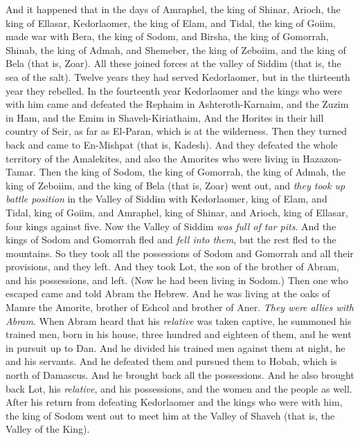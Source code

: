 \begin{biblechapter} %
 And it happened that in the days of Amraphel, the king of Shinar, Arioch, the king of Ellasar, Kedorlaomer, the king of Elam, and Tidal, the king of Goiim,
\verse made war with Bera, the king of Sodom, and Birsha, the king of Gomorrah, Shinab, the king of Admah, and Shemeber, the king of Zeboiim, and the king of Bela (that is, Zoar).
\verse All these joined forces at the valley of Siddim (that is, the sea of the salt).
\verse Twelve years they had served Kedorlaomer, but in the thirteenth year they rebelled.
\verse In the fourteenth year Kedorlaomer and the kings who were with him came and defeated the Rephaim in Ashteroth-Karnaim, and the Zuzim in Ham, and the Emim in Shaveh-Kiriathaim,
\verse And the Horites in their hill country of Seir, as far as El-Paran, which is at the wilderness.
\verse Then they turned back and came to En-Mishpat (that is, Kadesh). And they defeated the whole territory of the Amalekites, and also the Amorites who were living in Hazazon-Tamar.
\verse Then the king of Sodom, the king of Gomorrah, the king of Admah, the king of Zeboiim, and the king of Bela (that is, Zoar) went out, and \textit{they took up battle position} in the Valley of Siddim
\verse with Kedorlaomer, king of Elam, and Tidal, king of Goiim, and Amraphel, king of Shinar, and Arioch, king of Ellasar, four kings against five.
\verse Now the Valley of Siddim \textit{was full of tar pits}. And the kings of Sodom and Gomorrah fled and \textit{fell into them}, but the rest fled to the mountains.
\verse So they took all the possessions of Sodom and Gomorrah and all their provisions, and they left.
\verse And they took Lot, the son of the brother of Abram, and his possessions, and left. (Now he had been living in Sodom.)
\verse Then one who escaped came and told Abram the Hebrew. And he was living at the oaks of Mamre the Amorite, brother of Eshcol and brother of Aner. \textit{They were allies with Abram}.
\verse When Abram heard that his \textit{relative} was taken captive, he summoned his trained men, born in his house, three hundred and eighteen of them, and he went in pursuit up to Dan.
\verse And he divided his trained men against them at night, he and his servants. And he defeated them and pursued them to Hobah, which is north of Damascus.
\verse And he brought back all the possessions. And he also brought back Lot, his \textit{relative}, and his possessions, and the women and the people as well.
 After his return from defeating Kedorlaomer and the kings who were with him, the king of Sodom went out to meet him at the Valley of Shaveh (that is, the Valley of the King).

\end{biblechapter}
